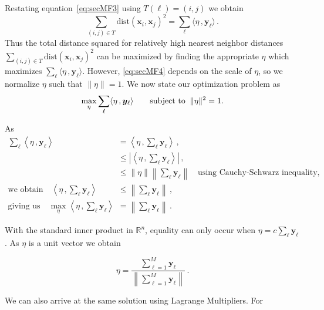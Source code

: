 \documentclass[letter,12pt]{article}
\newcommand{\dist}{\text{dist}}
\begin{document}
Restating equation~\eqref{eq:secMF3} using $T(\ell) = (i,j)$ we obtain
\begin{equation} \label{eq:secMF4}
	\sum_{(i,j) \in T}\dist(\bm{x}_i, \bm{x}_j)^2 = \sum_{\ell}\langle \eta\, , \bm{y}_{\ell} \rangle\, .
\end{equation}
Thus the total distance squared for relatively high nearest neighbor distances $ \sum_{(i,j) \in T}\dist(\bm{x}_i, \bm{x}_j)^2$ can be maximized by finding the appropriate $\eta$ which maximizes $\sum_{\ell}\langle \eta\, , \bm{y}_{\ell} \rangle$. However, \eqref{eq:secMF4} depends on the scale of $\eta$, so we normalize $\eta$ such that $ \lVert \eta \rVert = 1$. 
We now state our optimization problem as
\begin{equation} \label{eq:secMF5}
	\max_\eta \sum_{\ell}\langle \eta\, , \bm{y}_{\ell} \rangle
  \qquad
	\text{subject to} \hspace{0.2cm} \lVert\eta\rVert^2 = 1 .
\end{equation}
{\color{blue} 
As
\begin{align}  
 \sum_{\ell}\left\langle \eta\, , \bm{y}_{\ell} \right\rangle &  =   \left\langle \eta\, , \sum_{\ell}\bm{y}_{\ell} \right\rangle  \, ,  \\
 & \leq \left| \left\langle \eta\, , \sum_{\ell}\bm{y}_{\ell} \right\rangle  \right|  \, , \\
 & \leq \lVert \eta \rVert \left\lVert \sum_{\ell}\bm{y}_{\ell} \right\rVert \quad \text{using  Cauchy-Schwarz inequality, } \\
\text{we obtain} \quad \left\langle \eta\, , \sum_{\ell}\bm{y}_{\ell} \right\rangle & \leq \left\lVert \sum_{\ell}\bm{y}_{\ell} \right\rVert  \, , \\
\text{giving us} \quad \max_{\eta} \left\langle \eta\, , \sum_{\ell}\bm{y}_{\ell} \right\rangle & = \left\lVert \sum_{\ell}\bm{y}_{\ell} \right\rVert \, .
\end{align}

With the standard inner product in $\mathbb{R}^n$, equality can only occur when $\eta = c \sum_{\ell}\bm{y}_{\ell} $. As $\eta$ is a unit vector we obtain

\begin{equation}\label{eq:secMF9}
	\eta = \frac{\sum_{\ell=1}^M \bm{y}_\ell }{ \left\lVert\sum_{\ell=1}^M \bm{y}_\ell \right\rVert } \, .
\end{equation}


We can also arrive at the same solution using Lagrange Multipliers.  For }
\end{document}
